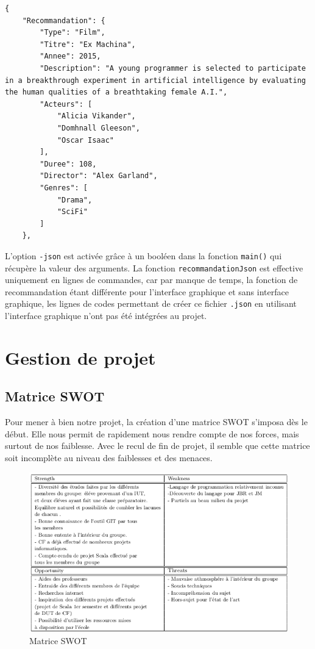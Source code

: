 \documentclass{article}
\begin{document}
\begin{lstlisting}
{
    "Recommandation": {
        "Type": "Film",
        "Titre": "Ex Machina",
        "Annee": 2015,
        "Description": "A young programmer is selected to participate in a breakthrough experiment in artificial intelligence by evaluating the human qualities of a breathtaking female A.I.",
        "Acteurs": [
            "Alicia Vikander",
            "Domhnall Gleeson",
            "Oscar Isaac"
        ],
        "Duree": 108,
        "Director": "Alex Garland",
        "Genres": [
            "Drama",
            "SciFi"
        ]
    },

\end{lstlisting}

L'option \verb'-json' est activée grâce à un booléen dans la fonction \verb'main()' qui récupère la valeur des arguments. La fonction \verb'recommandationJson' est effective uniquement en lignes de commandes, car par manque de temps, la fonction de recommandation étant différente pour l'interface graphique et sans interface graphique, les lignes de codes permettant de créer ce fichier \verb'.json' en utilisant l'interface graphique n'ont pas été intégrées au projet.


\newpage



\section{Gestion de projet}
\subsection{Matrice SWOT}
    Pour mener à bien notre projet, la création d'une matrice SWOT s'imposa dès le début. Elle nous permit de rapidement nous rendre compte de nos forces, mais surtout de nos faiblesse. Avec le recul de fin de projet, il semble que cette matrice soit incomplète au niveau des faiblesses et des menaces.
\begin{figure}[!h]
    \centering
    \includegraphics[scale=1]{SWOT.png}
    \caption{Matrice SWOT}
\end{figure}
    
\end{document}
